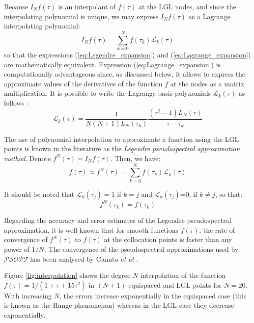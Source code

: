 \documentclass[a4paper,11pt]{report}    %
\newcommand{\psopt}{$\mathcal{PSOPT}$\,}  %
\begin{document}
Because $I_N f(\tau)$ is an interpolant of $f(\tau)$ at the LGL nodes, and since the interpolating 
polynomial is unique, we may express $I_N f(\tau)$ as a Lagrange interpolating polynomial:
\begin{equation} \label{eq:Lagrange_expansion}
    I_N f(\tau) = \sum\limits_{k=0}^N f(\tau_k) \mathcal{L}_k(\tau)
\end{equation}
so that the expressions (\ref{eq:Legendre_expansion}) and (\ref{eq:Lagrange_expansion}) are mathematically
equivalent. Expression (\ref{eq:Lagrange_expansion}) is computationally advantageous since,
as discussed below, it allows to express the approximate values of the derivatives of the function 
$f$ at the nodes as a matrix multiplication. It is possible to write the Lagrange basis polynomials
$\mathcal{L}_k(\tau)$  as follows \cite{Hesthaven:07}:
\[
  \mathcal{L}_k(\tau) = \frac{1}{N(N+1)L_N(\tau_k)} \frac{(\tau^2-1) \dot L_N(\tau)}{\tau-\tau_k}
\]

The use of polynomial interpolation to approximate a function using the LGL points is known in
the literature as the \textit{Legendre pseudospectral approximation method}. Denote $f^N(\tau) = I_N f(\tau)$. Then,
we have:
\begin{equation} \label{legendre_approx}
    f(\tau) \approx f^N(\tau) = \sum\limits_{k=0}^N f(\tau_k) \mathcal{L}_k(\tau)
\end{equation}


It should be noted that $\mathcal{L}_k(\tau_j)=1$ if $k=j$ and $\mathcal{L}_k(\tau_j)$=0, if $k\ne j$, so that:
\begin{equation} \label{eq:colloc}
f^N(\tau_k) = f(\tau_k)
\end{equation}

Regarding the accuracy and error estimates of the Legendre pseudospectral approximation,
it is well known that for smooth functions $f(\tau)$, the
rate of convergence of $f^N(\tau)$ to $f(\tau)$  at the collocation points is faster
than any power of $1/N$. The convergence of the pseudospectral approximations used
by \psopt has been analysed by Canuto \textit{et al} \cite{Canuto:06}.

Figure \ref{fig:interpolation} shows the degree $N$ interpolation of the function $f(\tau) = 1/(1 + \tau + 15\tau^2 )$ in $(N + 1)$ equispaced
and LGL points for $N = 20$. With increasing $N$, the errors increase
exponentially in the equispaced case (this is known as the Runge phenomenon) 
whereas in the LGL case they decrease exponentially.
\end{document}
